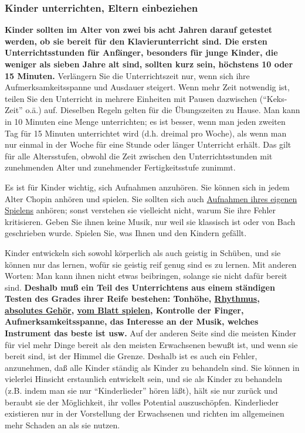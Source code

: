 \subsubsection{Kinder unterrichten, Eltern einbeziehen}
\label{c1iii16b}

\textbf{Kinder sollten im Alter von zwei bis acht Jahren darauf getestet werden, ob sie bereit für den Klavierunterricht sind.
Die ersten Unterrichtsstunden für Anfänger, besonders für junge Kinder, die weniger als sieben Jahre alt sind, sollten kurz sein, höchstens 10 oder 15 Minuten.}
Verlängern Sie die Unterrichtszeit nur, wenn sich ihre Aufmerksamkeitsspanne und Ausdauer steigert.
Wenn mehr Zeit notwendig ist, teilen Sie den Unterricht in mehrere Einheiten mit Pausen dazwischen (\enquote{Keks-Zeit} o.ä.) auf.
Dieselben Regeln gelten für die Übungszeiten zu Hause.
Man kann in 10 Minuten eine Menge unterrichten; es ist besser, wenn man jeden zweiten Tag für 15 Minuten unterrichtet wird (d.h. dreimal pro Woche), als wenn man nur einmal in der Woche für eine Stunde oder länger Unterricht erhält.
Das gilt für alle Altersstufen, obwohl die Zeit zwischen den Unterrichtsstunden mit zunehmenden Alter und zunehmender Fertigkeitsstufe zunimmt.

Es ist für Kinder wichtig, sich Aufnahmen anzuhören.
Sie können sich in jedem Alter Chopin anhören und spielen.
Sie sollten sich auch \hyperref[c1iii13]{Aufnahmen ihres eigenen Spielens} anhören; sonst verstehen sie vielleicht nicht, warum Sie ihre Fehler kritisieren.
Geben Sie ihnen keine Musik, nur weil sie klassisch ist oder von Bach geschrieben wurde.
Spielen Sie, was Ihnen und den Kindern gefällt.

Kinder entwickeln sich sowohl körperlich als auch geistig in Schüben, und sie können nur das lernen, wofür sie geistig reif genug sind es zu lernen.
Mit anderen Worten: Man kann ihnen nicht etwas beibringen, solange sie nicht dafür bereit sind.
\textbf{Deshalb muß ein Teil des Unterrichtens aus einem ständigen Testen des Grades ihrer Reife bestehen:
Tonhöhe, \hyperref[c1iii1b]{Rhythmus}, \hyperref[c1iii12]{absolutes Gehör}, \hyperref[c1iii11]{vom Blatt spielen}, Kontrolle der Finger, Aufmerksamkeitsspanne, das Interesse an der Musik, welches Instrument das beste ist usw.}
Auf der anderen Seite sind die meisten Kinder für viel mehr Dinge bereit als den meisten Erwachsenen bewußt ist, und wenn sie bereit sind, ist der Himmel die Grenze.
Deshalb ist es auch ein Fehler, anzunehmen, daß alle Kinder ständig als Kinder zu behandeln sind.
Sie können in vielerlei Hinsicht erstaunlich entwickelt sein, und sie als Kinder zu behandeln (z.B. indem man sie nur \enquote{Kinderlieder} hören läßt), hält sie nur zurück und beraubt sie der Möglichkeit, ihr volles Potential auszuschöpfen.
Kinderlieder existieren nur in der Vorstellung der Erwachsenen und richten im allgemeinen mehr Schaden an als sie nutzen.

